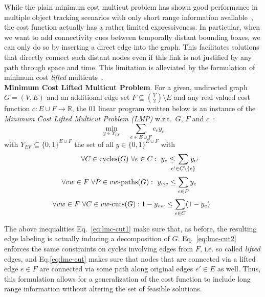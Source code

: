 While the plain minimum cost multicut problem has shown good performance in multiple object tracking scenarios with only short range information available~\cite{tang2016multi}, the cost function actually has a rather limited expressiveness. 
In particular, when we want to add connectivity cues between temporally distant bounding boxes, we can only do so by inserting a direct edge into the graph. 
This facilitates solutions that directly connect such distant nodes even if this link is not justified by any path through space and time. 
This limitation is alleviated by the formulation of minimum cost \emph{lifted} multicuts~\cite{keupericcv}.\\

\noindent\textbf{Minimum Cost Lifted Multicut Problem}.
For a given, undirected graph $G = (V, E)$ and an additional edge set $F\subseteq \binom{V}{2} \setminus E$ and any  real valued cost function $c: E \cup F \to \mathbb{R}$,
the 01 linear program written below is an instance of the
\emph{Minimum Cost Lifted Multicut Problem (LMP)}
w.r.t.~$G$, $F$ and $c$~\cite{keupericcv}:
%
\begin{equation}
\displaystyle\min_{y \in Y_{EF}} 
    \quad \sum_{e \in E \cup F} c_e y_e
    \label{eq:lmc}
\end{equation}
%
with $Y_{EF} \subseteq \{0,1\}^{E \cup F}$ the set of all $y \in \{0,1\}^{E \cup F}$ with
%
\begin{equation}
 \qquad\forall C \in \textnormal{cycles}(G)\ \forall e \in C:\ 
    y_e \leq \hspace{-2ex} \sum_{e' \in C \setminus \{e\}} \hspace{-2ex} y_{e'} 
\label{eq:lmc-cut1}
\end{equation}
\begin{equation}
 \forall vw \in F\ \forall P \in vw\textnormal{-paths}(G):\ 
    y_{vw} \leq \sum_{e \in P} y_e \quad
\label{eq:lmc-cut2}\end{equation}
\begin{equation}
 \hspace{-1ex} \forall vw \in F\ \forall C \in vw\textnormal{-cuts}(G):
    1 - y_{vw} \leq \sum_{e \in C} (1 - y_e) 
\label{eq:lmc-cut}
   \end{equation}

The above inequalities Eq.~\eqref{eq:lmc-cut1} make  sure that, as before, the resulting edge labeling is actually inducing a decomposition of $G$. Eq.~\eqref{eq:lmc-cut2} enforces the same constraints on cycles involving edges from $F$, i.e. so called \emph{lifted} edges, and Eq.\eqref{eq:lmc-cut} makes sure that nodes that are connected via a lifted edge $e\in F$ are connected via some path along original edges  $e'\in E$ as well. 
Thus, this formulation allows for a generalization of the cost function to include long range information without altering the set of feasible solutions.\\

